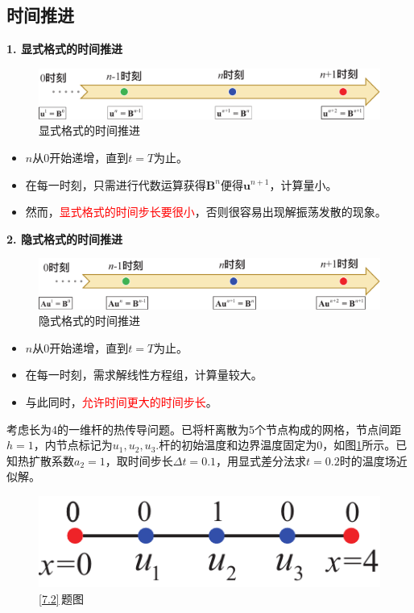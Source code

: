 \subsection{时间推进}
\noindent \textbf{1. 显式格式的时间推进}
\begin{figure}[!htb]
	\centering
	\includegraphics[width=0.7\linewidth]{pic/显式时间.pdf}
	\caption{显式格式的时间推进}
\end{figure}
\vspace*{-2em}

\begin{itemize}
	\item $n$从0开始递增，直到$t=T$为止。
	\item 在每一时刻，只需进行代数运算获得$\bm{B}^n$便得$\bm{u}^{n+1}$，计算量小。
	\item 然而，\textcolor{red}{显式格式的时间步长要很小}，否则很容易出现解振荡发散的现象。
\end{itemize}
\vspace*{1em}

\noindent \textbf{2. 隐式格式的时间推进}
\begin{figure}[!htb]
	\centering
	\includegraphics[width=0.7\linewidth]{pic/隐式时间.pdf}
	\caption{隐式格式的时间推进}
\end{figure}
\vspace*{-2em}

\begin{itemize}
	\item $n$从0开始递增，直到$t=T$为止。
	\item 在每一时刻，需求解线性方程组，计算量较大。
	\item 与此同时，\textcolor{red}{允许时间更大的时间步长}。
\end{itemize}

\examples \label{7.2} 考虑长为4的一维杆的热传导问题。已将杆离散为5个节点构成的网格，节点间距$h=1$，内节点标记为$u_1,u_2,u_3$.杆的初始温度和边界温度固定为0，如图\ref{7.2.1}所示。已知热扩散系数$a_2=1$，取时间步长$\Delta t=0.1$，用显式差分法求$t=0.2$时的温度场近似解。
\begin{figure}[!htb]
	\centering
	\includegraphics[width=0.24\linewidth]{pic/7.2.1.pdf}
	\vspace*{-0.8em}
	\caption{\ref{7.2}$\,$题图}
	\label{7.2.1}
\end{figure}
\vspace*{-1.5em}

